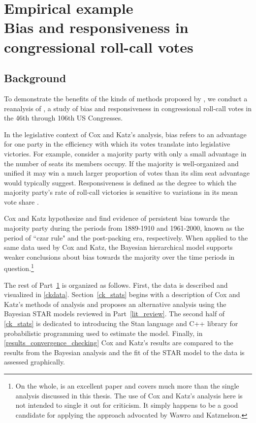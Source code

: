 \chapter[Empirical example: Bias and Responsiveness in Congressional Roll-Call Votes]{Empirical example \\[-20pt]\large Bias and responsiveness in congressional roll-call votes}
\label{cox_katz}

\vspace{-1cm}
\section{Background}
\label{ck_background}

To demonstrate the benefits of the kinds of methods proposed by , 
we conduct a reanalysis of , a study of bias and responsiveness 
in congressional roll-call votes in the 46th through 106th US Congresses. 

In the legislative context of Cox and Katz's analysis, bias refers to an advantage for one party 
in the efficiency with which its votes translate into legislative victories. For example, consider 
a majority party with only a small advantage in the number of seats its members occupy. If the 
majority is well-organized and unified it may win a much larger proportion of votes than its slim 
seat advantage would typically suggest. Responsiveness is defined as the degree to which the 
majority party's rate of roll-call victories is sensitive to variations in its mean vote share 
. 

Cox and Katz hypothesize and find evidence of persistent bias towards the majority party during 
the periods from 1889-1910 and 1961-2000, known as the period of ``czar rule" and the post-packing 
era, respectively. When applied to the same data used by Cox and Katz, the Bayesian hierarchical 
model supports weaker conclusions about bias towards the majority over the time periods in 
question.\footnote{On the whole,  is an excellent paper and covers 
much more than the single analysis discussed in this thesis. The use of Cox and Katz's analysis here
is not intended to single it out for criticism. It simply happens to be a good candidate for applying the 
approach advocated by Wawro and Katznelson.} 

The rest of Part~\ref{cox_katz} is organized as follows. First, the data is described and visualized 
in \ref{ckdata}. Section~\ref{ck_stats} begins with a description of Cox and Katz's methods of analysis 
and proposes an alternative analysis using the Bayesian STAR models reviewed in Part~\ref{lit_review}. 
The second half of \ref{ck_stats} is dedicated to introducing the Stan language and C++ library for 
probabilistic programming used to estimate the model. Finally, in \ref{results_convergence_checking}  
Cox and Katz's results are compared to the results from the Bayesian analysis and the fit of the STAR model
to the data is assessed graphically.  




